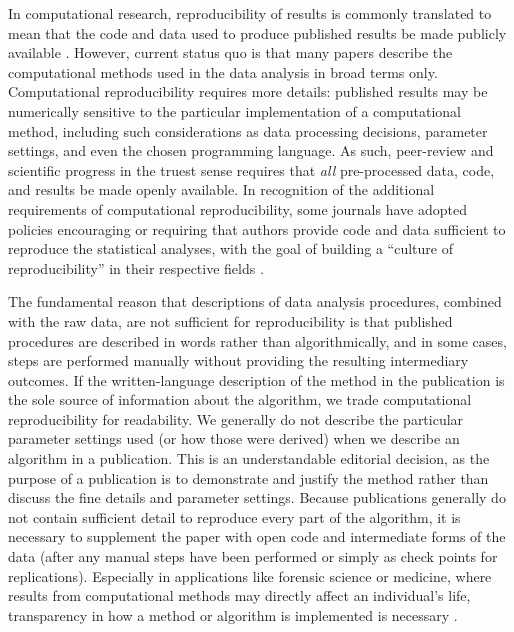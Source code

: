 In computational research, reproducibility of results is commonly
translated to mean that the code and data used to produce published
results be made publicly available \citep{peng_reproducible_2011}.
However, current status quo is that many papers describe the
computational methods used in the data analysis in broad terms only.
Computational reproducibility requires more details: published results
may be numerically sensitive to the particular implementation of a
computational method, including such considerations as data processing
decisions, parameter settings, and even the chosen programming language.
As such, peer-review and scientific progress in the truest sense
requires that \emph{all} pre-processed data, code, and results be made
openly available. In recognition of the additional requirements of
computational reproducibility, some journals have adopted policies
encouraging or requiring that authors provide code and data sufficient
to reproduce the statistical analyses, with the goal of building a
``culture of reproducibility'' in their respective fields
\citep{peng_reproducible_2009, peng_reproducible_2011, stodden_toward_2013}.

The fundamental reason that descriptions of data analysis procedures,
combined with the raw data, are not sufficient for reproducibility is
that published procedures are described in words rather than
algorithmically, and in some cases, steps are performed manually without
providing the resulting intermediary outcomes. If the written-language
description of the method in the publication is the sole source of
information about the algorithm, we trade computational reproducibility
for readability. We generally do not describe the particular parameter
settings used (or how those were derived) when we describe an algorithm
in a publication. This is an understandable editorial decision, as the
purpose of a publication is to demonstrate and justify the method rather
than discuss the fine details and parameter settings. Because
publications generally do not contain sufficient detail to reproduce
every part of the algorithm, it is necessary to supplement the paper
with open code and intermediate forms of the data (after any manual
steps have been performed or simply as check points for replications).
Especially in applications like forensic science or medicine, where
results from computational methods may directly affect an individual's
life, transparency in how a method or algorithm is implemented is
necessary \citep{angwin_machine_2016, cino_deploying_2018}.

